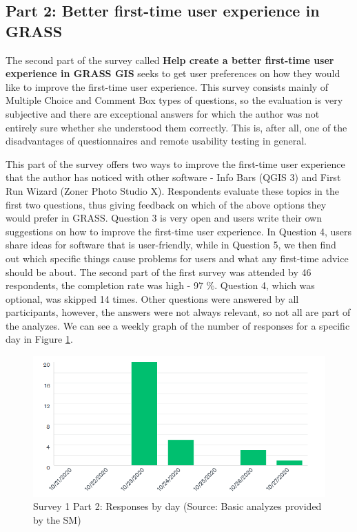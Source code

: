 \documentclass[a4paper,10pt,twoside]{article}
\begin{document}
\newpage
\vspace*{-1cm}
\subsection{Part 2: Better first-time user experience in GRASS}

\noindent The second part of the survey called \textbf{Help create a
  better first-time user experience in GRASS GIS} seeks to get user
preferences on how they would like to improve the first-time user
experience. This survey consists mainly of Multiple Choice and Comment
Box types of questions, so the evaluation is very subjective and there
are exceptional answers for which the author was not entirely sure
whether she understood them correctly. This is, after all, one of the
disadvantages of questionnaires and remote usability testing in
general.

This part of the survey offers two ways to improve the first-time user
experience that the author has noticed with other software - Info Bars
(QGIS 3) and First Run Wizard (Zoner Photo Studio X). Respondents
evaluate these topics in the first two questions, thus giving feedback
on which of the above options they would prefer in GRASS. Question 3
is very open and users write their own suggestions on how to improve
the first-time user experience. In Question 4, users share ideas for
software that is user-friendly, while in Question 5, we then find out
which specific things cause problems for users and what any first-time
advice should be about. The second part of the first survey was
attended by 46 respondents, the completion rate was high - 97
\%. Question 4, which was optional, was skipped 14 times. Other
questions were answered by all participants, however, the answers were
not always relevant, so not all are part of the analyzes. We can see a
weekly graph of the number of responses for a specific day in Figure
\ref{fig:survey1_part2_insight2}.

\vspace{0.3cm}
\begin{figure}[hbt!] 
\begin{center}
\includegraphics[width=15cm]{../surveys/analyzed_data/survey1_part2_insight2.png} 
\caption[Survey 1 Part 2: Responses by day]{Survey 1 Part 2: Responses by day (Source: Basic analyzes provided by the SM)}
\label{fig:survey1_part2_insight2}
\end{center}
\end{figure}
\end{document}
